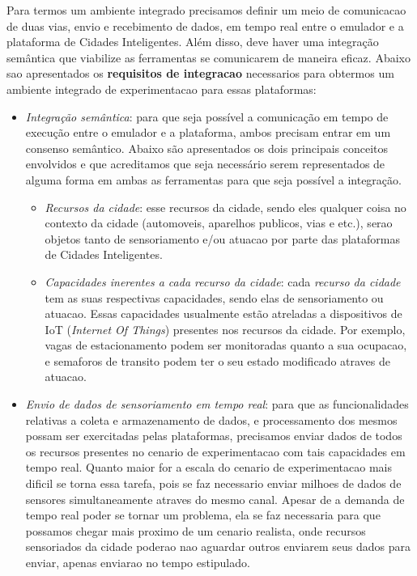 Para termos um ambiente integrado precisamos definir um meio de comunicacao de duas vias, envio e recebimento de dados, em tempo real entre o emulador e a plataforma de Cidades Inteligentes.
Além disso, deve haver uma integração semântica que viabilize as ferramentas se comunicarem de maneira eficaz.
Abaixo sao apresentados os \textbf{requisitos de integracao} necessarios para obtermos um ambiente integrado de experimentacao para essas plataformas:

\begin{itemize}
    \item \textit{Integração semântica}: para que seja possível a comunicação em tempo de execução entre o emulador e a plataforma, ambos precisam entrar em um consenso semântico.
        Abaixo são apresentados os dois principais conceitos envolvidos e que acreditamos que seja necessário serem representados de alguma forma em ambas as ferramentas para que seja
        possível a integração.

        \begin{itemize}
            \item \textit{Recursos da cidade}: esse recursos da cidade, sendo eles qualquer coisa no contexto da cidade (automoveis, aparelhos publicos, vias e etc.), serao objetos tanto de
                sensoriamento e/ou atuacao por parte das plataformas de Cidades Inteligentes.

            \item \textit{Capacidades inerentes a cada recurso da cidade}: cada \textit{recurso da cidade} tem as suas respectivas capacidades, sendo elas de sensoriamento ou atuacao.
                Essas capacidades usualmente estão atreladas a dispositivos de IoT (\textit{Internet Of Things}) presentes nos recursos da cidade.
                Por exemplo, vagas de estacionamento podem ser monitoradas quanto a sua ocupacao, e semaforos de transito podem ter o seu estado modificado atraves de atuacao.
        \end{itemize}

    \item \textit{Envio de dados de sensoriamento em tempo real}: para que as funcionalidades relativas a coleta e armazenamento de dados, e processamento dos mesmos possam ser
        exercitadas pelas plataformas, precisamos enviar dados de todos os recursos presentes no cenario de experimentacao com tais capacidades em tempo real.
        Quanto maior for a escala do cenario de experimentacao mais dificil se torna essa tarefa, pois se faz necessario enviar milhoes de dados de sensores simultaneamente atraves
        do mesmo canal.
        Apesar de a demanda de tempo real poder se tornar um problema, ela se faz necessaria para que possamos chegar mais proximo de um cenario realista, onde recursos sensoriados
        da cidade poderao nao aguardar outros enviarem seus dados para enviar, apenas enviarao no tempo estipulado.


\end{itemize}
